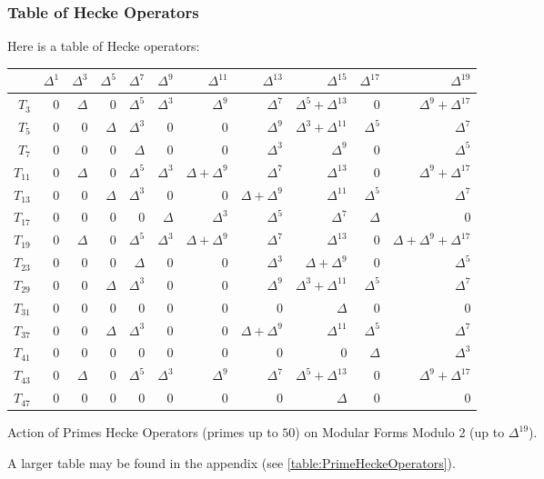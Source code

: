 \subsubsection{Table of Hecke Operators}
Here is a table of Hecke operators:
\begin{center}
	\begin{tabular}{|r|rrrrrrrrrr|}
		\hline
		\textbf{} & \textbf{$\Delta^1$} & \textbf{$\Delta^3$} & \textbf{$\Delta^5$} & \textbf{$\Delta^7$} & \textbf{$\Delta^9$} & \textbf{$\Delta^{11}$} & \textbf{$\Delta^{13}$} & \textbf{$\Delta^{15}$} & \textbf{$\Delta^{17}$} & \textbf{$\Delta^{19}$} \\
		\hline
		$T_3$ & 0 & $\Delta$ & 0 & $\Delta^5$ & $\Delta^3$ & $\Delta^9$ & $\Delta^7$ & $\Delta^5 + \Delta^{13}$ & 0 & $\Delta^9 + \Delta^{17}$ \\       
		$T_5$ & 0 & 0 & $\Delta$ & $\Delta^3$ & 0 & 0 & $\Delta^9$ & $\Delta^3 + \Delta^{11}$ & $\Delta^5$ & $\Delta^7$ \\
		$T_7$ & 0 & 0 & 0 & $\Delta$ & 0 & 0 & $\Delta^3$ & $\Delta^9$ & 0 & $\Delta^5$ \\
		$T_{11}$ & 0 & $\Delta$ & 0 & $\Delta^5$ & $\Delta^3$ & $\Delta + \Delta^9$ & $\Delta^7$ & $\Delta^{13}$ & 0 & $\Delta^9 + \Delta^{17}$ \\
		$T_{13}$ & 0 & 0 & $\Delta$ & $\Delta^3$ & 0 & 0 & $\Delta + \Delta^9$ & $\Delta^{11}$ & $\Delta^5$ & $\Delta^7$ \\
		$T_{17}$ & 0 & 0 & 0 & 0 & $\Delta$ & $\Delta^3$ & $\Delta^5$ & $\Delta^7$ & $\Delta$ & 0 \\
		$T_{19}$ & 0 & $\Delta$ & 0 & $\Delta^5$ & $\Delta^3$ & $\Delta + \Delta^9$ & $\Delta^7$ & $\Delta^{13}$ & 0 & $\Delta + \Delta^9 + \Delta^{17}$ \\   
		$T_{23}$ & 0 & 0 & 0 & $\Delta$ & 0 & 0 & $\Delta^3$ & $\Delta + \Delta^9$ & 0 & $\Delta^5$ \\
		$T_{29}$ & 0 & 0 & $\Delta$ & $\Delta^3$ & 0 & 0 & $\Delta^9$ & $\Delta^3 + \Delta^{11}$ & $\Delta^5$ & $\Delta^7$ \\
		$T_{31}$ & 0 & 0 & 0 & 0 & 0 & 0 & 0 & $\Delta$ & 0 & 0 \\
		$T_{37}$ & 0 & 0 & $\Delta$ & $\Delta^3$ & 0 & 0 & $\Delta + \Delta^9$ & $\Delta^{11}$ & $\Delta^5$ & $\Delta^7$ \\
		$T_{41}$ & 0 & 0 & 0 & 0 & 0 & 0 & 0 & 0 & $\Delta$ & $\Delta^3$ \\
		$T_{43}$ & 0 & $\Delta$ & 0 & $\Delta^5$ & $\Delta^3$ & $\Delta^9$ & $\Delta^7$ & $\Delta^5 + \Delta^{13}$ & 0 & $\Delta^9 + \Delta^{17}$ \\
		$T_{47}$ & 0 & 0 & 0 & 0 & 0 & 0 & 0 & $\Delta$ & 0 & 0 \\
		\hline
	\end{tabular}

	Action of Primes Hecke Operators (primes up to $50$) on Modular Forms Modulo 2 (up to $\Delta^{19}$).
\end{center}
A larger table may be found in the appendix (see \ref{table:PrimeHeckeOperators}).

